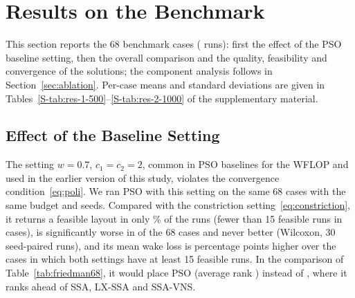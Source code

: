 \providecommand{\NBaseOldBest}{\TBD{macro: NBaseOldBest}}
\providecommand{\NBaseNewBest}{\TBD{macro: NBaseNewBest}}
\providecommand{\NBaseOldPSORank}{\TBD{macro: NBaseOldPSORank}}
\providecommand{\NBaseNewPSORank}{\TBD{macro: NBaseNewPSORank}}
\providecommand{\NBaseOldLXBVRank}{\TBD{macro: NBaseOldLXBVRank}}
\providecommand{\NBaseNewLXBVRank}{\TBD{macro: NBaseNewLXBVRank}}
\providecommand{\NBaseOldSSAVNSRank}{\TBD{macro: NBaseOldSSAVNSRank}}
\providecommand{\NBaseNewSSAVNSRank}{\TBD{macro: NBaseNewSSAVNSRank}}
\providecommand{\NBaseOldLXBVvsPSO}{\TBD{macro: NBaseOldLXBVvsPSO}}
\providecommand{\NBaseNewLXBVvsPSO}{\TBD{macro: NBaseNewLXBVvsPSO}}
\providecommand{\NBaseOldSSAVNSvsPSO}{\TBD{macro: NBaseOldSSAVNSvsPSO}}
\providecommand{\NBaseNewSSAVNSvsPSO}{\TBD{macro: NBaseNewSSAVNSvsPSO}}

\section{Results on the Benchmark}
\label{sec:results}
This section reports the 68 benchmark cases (\NRunsBenchmark{} runs): first the effect of the PSO baseline setting, then the overall comparison and the quality, feasibility and convergence of the solutions; the component analysis follows in Section~\ref{sec:ablation}. Per-case means and standard deviations are given in Tables~\ref{S-tab:res-1-500}--\ref{S-tab:res-2-1000} of the supplementary material.

\subsection{Effect of the Baseline Setting}
\label{sec:psosetting}
\label{sec:baseline}
The setting $w=0.7$, $c_1=c_2=2$, common in PSO baselines for the WFLOP and used in the earlier version of this study, violates the convergence condition~\eqref{eq:poli}. We ran PSO with this setting on the same 68 cases with the same budget and seeds. Compared with the constriction setting~\eqref{eq:constriction}, it returns a feasible layout in only \NOldPSOFeas\% of the runs (fewer than 15 feasible runs in \NOldPSOBelowHalf{} cases), is significantly worse in \NOldPSOWorse{} of the 68 cases and never better (Wilcoxon, 30 seed-paired runs), and its mean wake loss is \NOldPSODL{} percentage points higher over the \NOldPSOCases{} cases in which both settings have at least 15 feasible runs. In the comparison of Table~\ref{tab:friedman68}, it would place PSO \NOldPSOPos{} (average rank \NOldPSORank) instead of \NPSOPos, where it ranks ahead of SSA, LX-SSA and SSA-VNS.

